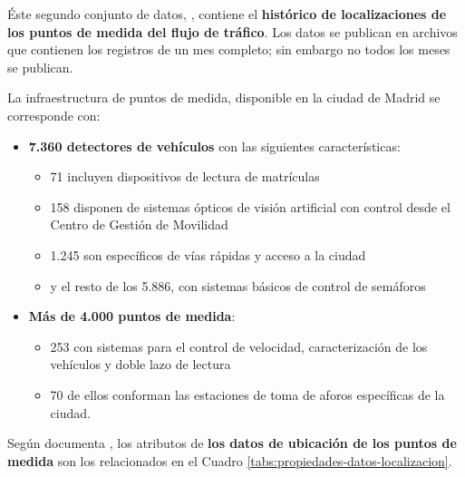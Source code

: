 \documentclass[]{book}
\providecommand{\tightlist}{%
  \setlength{\itemsep}{0pt}\setlength{\parskip}{0pt}}
\begin{document}
Éste segundo conjunto de datos, \citep{locations2018madrid}, contiene el
\textbf{histórico de localizaciones de los puntos de medida del flujo de
tráfico}. Los datos se publican en archivos que contienen los registros
de un mes completo; sin embargo no todos los meses se publican.

La infraestructura de puntos de medida, disponible en la ciudad de
Madrid se corresponde con:

\begin{itemize}
\tightlist
\item
  \textbf{7.360 detectores de vehículos} con las siguientes
  características:

  \begin{itemize}
  \tightlist
  \item
    71 incluyen dispositivos de lectura de matrículas
  \item
    158 disponen de sistemas ópticos de visión artificial con control
    desde el Centro de Gestión de Movilidad
  \item
    1.245 son específicos de vías rápidas y acceso a la ciudad
  \item
    y el resto de los 5.886, con sistemas básicos de control de
    semáforos
  \end{itemize}
\item
  \textbf{Más de 4.000 puntos de medida}:

  \begin{itemize}
  \tightlist
  \item
    253 con sistemas para el control de velocidad, caracterización de
    los vehículos y doble lazo de lectura
  \item
    70 de ellos conforman las estaciones de toma de aforos específicas
    de la ciudad.
  \end{itemize}
\end{itemize}

Según documenta \citep{locations2018madrid}, los atributos de
\textbf{los datos de ubicación de los puntos de medida} son los
relacionados en el Cuadro \ref{tabs:propiedades-datos-localizacion}.
\end{document}
